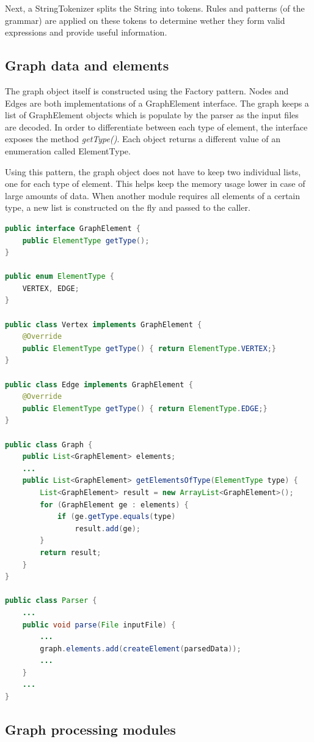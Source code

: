 Next, a StringTokenizer splits the String into tokens. Rules and patterns (of the grammar) are applied on these tokens 
to determine wether they form valid expressions and provide useful information.

\subsection{Graph data and elements}

The graph object itself is constructed using the Factory pattern. Nodes and Edges are both implementations of a 
GraphElement interface. The graph keeps a list of GraphElement objects which is populate by the parser as the input 
files are decoded. In order to differentiate between each type of element, the interface exposes the method 
\emph{getType()}. Each object returns a different value of an enumeration called ElementType. 

Using this pattern, the graph object does not have to keep two individual lists, one for each type of element. This 
helps keep the memory usage lower in case of large amounts of data. When another module requires all elements of a 
certain type, a new list is constructed on the fly and passed to the caller.

\begin{lstlisting}[caption=Basic class structure for factory implementation, language=Java]
public interface GraphElement {
	public ElementType getType();
}

public enum ElementType {
	VERTEX, EDGE;
}

public class Vertex implements GraphElement {
	@Override
	public ElementType getType() { return ElementType.VERTEX;}
}

public class Edge implements GraphElement {
	@Override
	public ElementType getType() { return ElementType.EDGE;}
}

public class Graph {
	public List<GraphElement> elements;
	...
	public List<GraphElement> getElementsOfType(ElementType type) {
		List<GraphElement> result = new ArrayList<GraphElement>();
		for (GraphElement ge : elements) {
			if (ge.getType.equals(type)
				result.add(ge);
		}
		return result;
	}
}

public class Parser {
	...
	public void parse(File inputFile) {
		...
		graph.elements.add(createElement(parsedData));
		...
	}
	...
}

\end{lstlisting}

\subsection{Graph processing modules}

